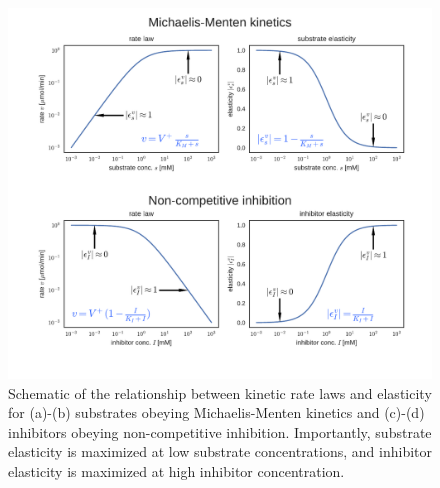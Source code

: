 \documentclass[12pt,a4paper]{article}
\begin{document}
\begin{figure}[ht!]
	\includegraphics[width=\textwidth]{../manuscript/figS4.pdf}
	\caption{Schematic of the relationship between kinetic rate laws and elasticity for (a)-(b) substrates obeying Michaelis-Menten kinetics and (c)-(d) inhibitors obeying non-competitive inhibition. Importantly, substrate elasticity is maximized at low substrate concentrations, and inhibitor elasticity is maximized at high inhibitor concentration.
	}
\end{figure}
\end{document}
